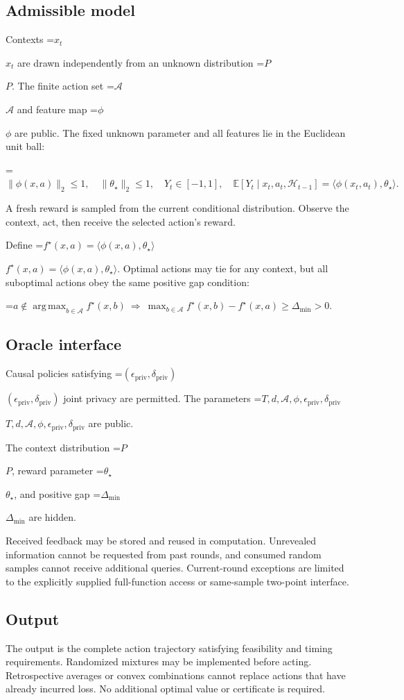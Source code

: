 \documentclass[10pt,a4paper]{article}
\newcommand{\AtlasMath}[1]{\par\begingroup\centering\setbox0=\hbox{$\displaystyle #1$}\ifdim\wd0>1.4\linewidth\typeout{ATLAS WIDE FORMULA: \the\wd0}\fi\ifdim\wd0>\linewidth\resizebox{\linewidth}{!}{\box0}\else\box0\fi\par\endgroup}
\newcommand{\AtlasInlineMath}[1]{\begingroup\setbox0=\hbox{$#1$}\ifdim\wd0>.4\linewidth\endgroup\AtlasMath{#1}\else\endgroup$#1$\fi}
\begin{document}
\subsection{Admissible model}
Contexts \AtlasInlineMath{x_t} are drawn independently from an unknown distribution \AtlasInlineMath{P}. The finite action set \AtlasInlineMath{\mathcal{A}} and feature map \AtlasInlineMath{\phi} are public. The fixed unknown parameter and all features lie in the Euclidean unit ball:


\AtlasMath{\|\phi(x,a)\|_2\le1,\quad\|\theta_\star\|_2\le1,\quad Y_t\in[-1,1],\quad\mathbb{E}[Y_t\mid x_t,a_t,\mathcal{H}_{t-1}]=\langle\phi(x_t,a_t),\theta_\star\rangle.}


A fresh reward is sampled from the current conditional distribution. Observe the context, act, then receive the selected action's reward.

Define \AtlasInlineMath{f^\star(x,a)=\langle\phi(x,a),\theta_\star\rangle}. Optimal actions may tie for any context, but all suboptimal actions obey the same positive gap condition:


\AtlasMath{a\notin\operatorname*{arg\,max}_{b\in\mathcal{A}}f^\star(x,b)\ \Longrightarrow\ \max_{b\in\mathcal{A}}f^\star(x,b)-f^\star(x,a)\ge\Delta_{\min}>0.}


\subsection{Oracle interface}
Causal policies satisfying \AtlasInlineMath{(\epsilon_{\mathrm{priv}},\delta_{\mathrm{priv}})} joint privacy are permitted. The parameters \AtlasInlineMath{T,d,\mathcal{A},\phi,\epsilon_{\mathrm{priv}},\delta_{\mathrm{priv}}} are public.

The context distribution \AtlasInlineMath{P}, reward parameter \AtlasInlineMath{\theta_\star}, and positive gap \AtlasInlineMath{\Delta_{\min}} are hidden.

Received feedback may be stored and reused in computation. Unrevealed information cannot be requested from past rounds, and consumed random samples cannot receive additional queries. Current-round exceptions are limited to the explicitly supplied full-function access or same-sample two-point interface.

\subsection{Output}
The output is the complete action trajectory satisfying feasibility and timing requirements. Randomized mixtures may be implemented before acting. Retrospective averages or convex combinations cannot replace actions that have already incurred loss. No additional optimal value or certificate is required.
\end{document}
